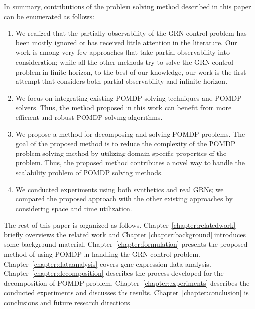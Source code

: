 In summary, contributions of the problem solving method described in this paper can be enumerated as follows:
\begin{enumerate}

\item We realized that the partially observability of the GRN control problem has been mostly ignored or has
received little attention in the literature. Our work is among very few approaches that take partial
observability into consideration; while all the other methods try to solve the GRN control problem in finite
horizon, to the best of our knowledge, our work is the first attempt that considers both partial
observability and infinite horizon.

\item We focus on integrating existing POMDP solving techniques and POMDP solvers. Thus, the method proposed
in this work can benefit from more efficient and robust POMDP solving algorithms.

\item We propose a method for decomposing and solving POMDP problems. The goal of the proposed method is to
reduce the complexity of the POMDP problem solving method by utilizing domain specific properties of the
problem. Thus, the proposed method contributes a novel way to handle the scalability problem of POMDP solving
methods.

\item We conducted experiments using both synthetics and real GRNs; we compared the proposed approach with
the other existing approaches by considering space and time utilization.
\end{enumerate}

The rest of this paper is organized as follows. Chapter~\ref{chapter:relatedwork} briefly overviews the
related work and Chapter \ref{chapter:background} introduces some background material. Chapter~\ref{chapter:formulation} presents the proposed method of using POMDP in handling the GRN control
problem. Chapter~\ref{chapter:dataanalysis} covers gene expression data analysis. Chapter~\ref{chapter:decomposition}
describes the process developed for the decomposition of POMDP problem. Chapter~\ref{chapter:experiments} describes the
conducted experiments and discusses the results. Chapter~\ref{chapter:conclusion} is conclusions and future research
directions

